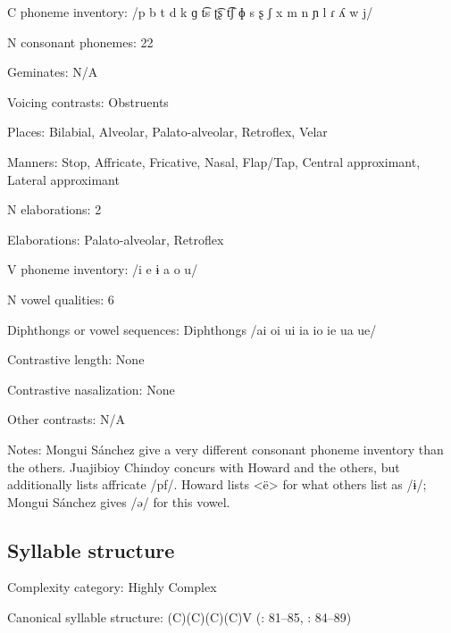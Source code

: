 {\begin{appendixdesc}
\item[C phoneme inventory:] /p b t d k ɡ t͡s ʈ͡ʂ t͡ʃ ɸ s ʂ ʃ x m n ɲ l ɾ ʎ w j/

\item[N consonant phonemes:] 22

\item[Geminates:] N/A

\item[Voicing contrasts:] Obstruents

\item[Places:] Bilabial, Alveolar, Palato-alveolar, Retroflex, Velar

\item[Manners:] Stop, Affricate, Fricative, Nasal, Flap/Tap, Central approximant, Lateral approximant

\item[N elaborations:] 2

\item[Elaborations:] Palato-alveolar, Retroflex

\item[V phoneme inventory:] /i e ɨ a o u/

\item[N vowel qualities:] 6

\item[Diphthongs or vowel sequences:] Diphthongs /ai oi ui ia io ie ua ue/

\item[Contrastive length:] None

\item[Contrastive nasalization:] None

\item[Other contrasts:] N/A

\item[Notes:] Mongui Sánchez give a very different consonant phoneme inventory than the others. Juajibioy Chindoy concurs with Howard and the others, but additionally lists affricate /pf/. Howard lists <ë> for what others list as /ɨ/; Mongui Sánchez gives /ə/ for this vowel.
\end{appendixdesc}
\subsection*{Syllable structure}
\begin{appendixdesc}

\item[Complexity category:] Highly Complex

\item[Canonical syllable structure:] (C)(C)(C)(C)V (\citealt{Howard1967}: 81--85, \citealt{Howard1972}: 84--89)


\end{appendixdesc}}
